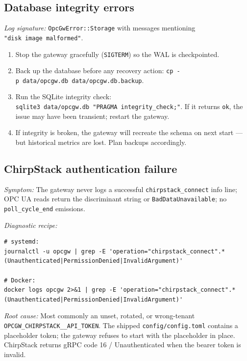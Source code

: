 \subsection{Database integrity errors}\label{sec-issue-database-corruption}

\emph{Log signature:} \texttt{OpcGwError::Storage} with messages mentioning \texttt{"disk\ image\ malformed"}.

\begin{enumerate}
\def\labelenumi{\arabic{enumi}.}
\item
  Stop the gateway gracefully (\texttt{SIGTERM}) so the WAL is checkpointed.
\item
  Back up the database before any recovery action: \texttt{cp\ -p\ data/opcgw.db\ data/opcgw.db.backup}.
\item
  Run the SQLite integrity check: \texttt{sqlite3\ data/opcgw.db\ "PRAGMA\ integrity\_check;"}. If it returns \texttt{ok}, the issue may have been transient; restart the gateway.
\item
  If integrity is broken, the gateway will recreate the schema on next start --- but historical metrics are lost. Plan backups accordingly.
\end{enumerate}

\subsection{ChirpStack authentication failure}\label{sec-issue-chirpstack-auth}

\emph{Symptom:} The gateway never logs a successful \texttt{chirpstack\_connect} info line; OPC UA reads return the discriminant string or \texttt{BadDataUnavailable}; no \texttt{poll\_cycle\_end} emissions.

\emph{Diagnostic recipe:}

\begin{lstlisting}
# systemd:
journalctl -u opcgw | grep -E 'operation="chirpstack_connect".*(Unauthenticated|PermissionDenied|InvalidArgument)'

# Docker:
docker logs opcgw 2>&1 | grep -E 'operation="chirpstack_connect".*(Unauthenticated|PermissionDenied|InvalidArgument)'
\end{lstlisting}

\emph{Root cause:} Most commonly an unset, rotated, or wrong-tenant \texttt{OPCGW\_CHIRPSTACK\_\_API\_TOKEN}. The shipped \texttt{config/config.toml} contains a placeholder token; the gateway refuses to start with the placeholder in place. ChirpStack returns gRPC code 16 / Unauthenticated when the bearer token is invalid.

